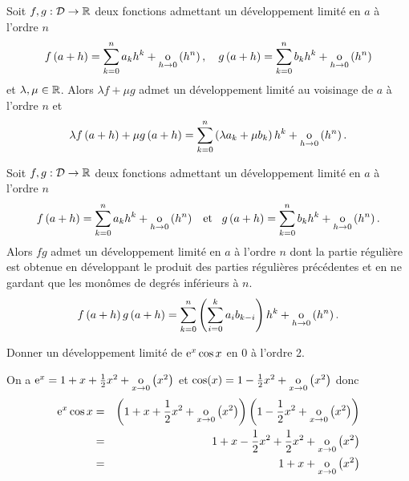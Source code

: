 \documentclass{magnolia}
\begin{document}
\begin{proposition}[utile=-3]
Soit $f,g:\mathcal{D}\to\mathbb{R}$ deux fonctions admettant un développement limité en
$a$ à l'ordre $n$
\[f\left(a+h\right)=\sum_{k=0}^n a_k h^k+\underset{h \rightarrow 0}{\text{o}}\left(h^n\right),\quad
  g\left(a+h\right)=\sum_{k=0}^n b_k h^k+\underset{h \rightarrow 0}{\text{o}}\left(h^n\right)\]
et $\lambda,\mu\in\mathbb{R}$. Alors $\lambda f+\mu g$ admet un développement limité au
voisinage de $a$ à l'ordre $n$ et
\[\lambda f\left(a+h\right)+\mu g\left(a+h\right)=
  \sum_{k=0}^n \left(\lambda a_k+\mu b_k\right) h^k+\underset{h \rightarrow 0}{\text{o}}\left(h^n\right).\]
\end{proposition}

\begin{proposition}[utile=-3]
Soit $f,g:\mathcal{D}\to\mathbb{R}$ deux fonctions admettant un développement limité en
$a$ à l'ordre $n$
\[f\left(a+h\right)=\sum_{k=0}^n a_k h^k+\underset{h \rightarrow 0}{\text{o}}\left(h^n\right) \quad\!\text{et}\quad\!
  g\left(a+h\right)=\sum_{k=0}^n b_k h^k+\underset{h \rightarrow 0}{\text{o}}\left(h^n\right).\]
Alors $fg$ admet un développement limité en $a$ à l'ordre $n$ dont la
partie régulière est obtenue en développant le produit des parties régulières
précédentes et en ne gardant que les monômes de degrés inférieurs à $n$.
\[f\left(a+h\right)g\left(a+h\right)=\sum_{k=0}^n \left(\sum_{i=0}^k a_i b_{k-i}\right) h^k+\underset{h \rightarrow 0}{\text{o}}\left(h^n\right).\]
\end{proposition}

\begin{exoUnique}
\exo Donner un développement limité de ${\rm e}^x \cos x$ en 0 à l'ordre 2.
\end{exoUnique}

\begin{sol}
On a ${\rm e}^x=1+x+\frac{1}{2}x^2+\underset{x \rightarrow 0}{\text{o}}\left(x^2\right)$ et $\cos(x)=1-\frac{1}{2}x^2+\underset{x \rightarrow 0}{\text{o}}\left(x^2\right)$ donc 
\begin{eqnarray*}
{\rm e}^x \cos x&=&\left(1+x+\frac{1}{2}x^2+\underset{x \rightarrow 0}{\text{o}}\left(x^2\right)\right)\left(1-\frac{1}{2}x^2+\underset{x \rightarrow 0}{\text{o}}\left(x^2\right)\right)\\
&=&1+x-\frac{1}{2}x^2+\frac{1}{2}x^2+\underset{x \rightarrow 0}{\text{o}}\left(x^2\right)\\
&=&1+x+\underset{x \rightarrow 0}{\text{o}}\left(x^2\right)
\end{eqnarray*}
\end{sol}
\end{document}
